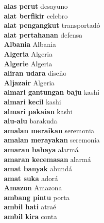 \textbf{ alas perut  } desayuno \\
\textbf{ alat berfikir  } celebro \\
\textbf{ alat pengangkut  } transportadó \\
\textbf{ alat pertahanan  } defensa \\
\textbf{ Albania  } Albania \\
\textbf{ Algeria  } Algeria \\
\textbf{ Algerie  } Algeria \\
\textbf{ aliran udara  } diseño \\
\textbf{ Aljazair  } Algeria \\
\textbf{ almari gantungan baju  } kashi \\
\textbf{ almari kecil  } kashi \\
\textbf{ almari pakaian  } kashi \\
\textbf{ alu-alu  } barakuda \\
\textbf{ amalan meraikan  } seremonia \\
\textbf{ amalan merayakan  } seremonia \\
\textbf{ amaran bahaya  } alarmá \\
\textbf{ amaran kecemasan  } alarmá \\
\textbf{ amat banyak  } abundá \\
\textbf{ amat suka  } adorá \\
\textbf{ Amazon  } Amazona \\
\textbf{ ambang pintu  } porta \\
\textbf{ ambil hati  } atraé \\
\textbf{ ambil kira  } conta \\
